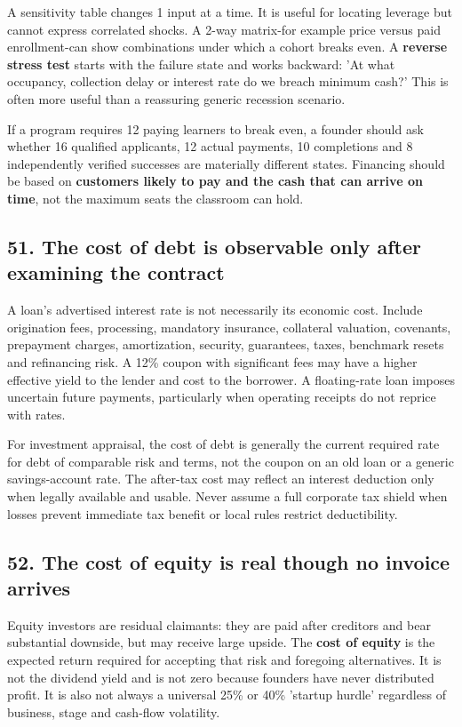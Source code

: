 A sensitivity table changes 1 input at a time. It is useful for locating leverage but cannot express correlated shocks. A 2-way matrix-for example price versus paid enrollment-can show combinations under which a cohort breaks even. A \textbf{reverse stress test} starts with the failure state and works backward: 'At what occupancy, collection delay or interest rate do we breach minimum cash?' This is often more useful than a reassuring generic recession scenario.

If a program requires 12 paying learners to break even, a founder should ask whether 16 qualified applicants, 12 actual payments, 10 completions and 8 independently verified successes are materially different states. Financing should be based on \textbf{customers likely to pay and the cash that can arrive on time}, not the maximum seats the classroom can hold.

\subsection{51. The cost of debt is observable only after examining the contract}


A loan's advertised interest rate is not necessarily its economic cost. Include origination fees, processing, mandatory insurance, collateral valuation, covenants, prepayment charges, amortization, security, guarantees, taxes, benchmark resets and refinancing risk. A 12\% coupon with significant fees may have a higher effective yield to the lender and cost to the borrower. A floating-rate loan imposes uncertain future payments, particularly when operating receipts do not reprice with rates.

For investment appraisal, the cost of debt is generally the current required rate for debt of comparable risk and terms, not the coupon on an old loan or a generic savings-account rate. The after-tax cost may reflect an interest deduction only when legally available and usable. Never assume a full corporate tax shield when losses prevent immediate tax benefit or local rules restrict deductibility.

\subsection{52. The cost of equity is real though no invoice arrives}


Equity investors are residual claimants: they are paid after creditors and bear substantial downside, but may receive large upside. The \textbf{cost of equity} is the expected return required for accepting that risk and foregoing alternatives. It is not the dividend yield and is not zero because founders have never distributed profit. It is also not always a universal 25\% or 40\% 'startup hurdle' regardless of business, stage and cash-flow volatility.

